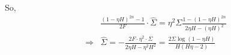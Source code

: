 So,
\begin{equation*}
    \begin{aligned}
        &\frac{(1-\eta H)^{2n}-1}{2F}\cdot\widehat{\Sigma} =  \eta^2\Sigma\frac{1-(1-\eta H)^{2n}}{2\eta H-(\eta H)^2}\\
        \Rightarrow& \widehat{\Sigma} = -\frac{2F\cdot\eta^2\cdot\Sigma}{2\eta H - \eta^2H^2} = \frac{2\Sigma\log(1-\eta H)}{H(H\eta-2)}
    \end{aligned}
\end{equation*}









